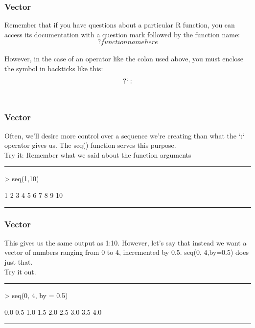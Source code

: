 \documentclass{beamer}
\begin{document}
\begin{frame}[fragile]
	\frametitle{Vector}
  	Remember that if you have questions about a particular R function, you can access its documentation with a question mark followed by the function name:\\
\begin{equation}?function name here \end{equation}\\
  However, in the case of an operator like the colon used above, you must enclose the symbol in backticks like this:\\
  \begin{equation}?`: \end{equation}\\
\end{frame}

\begin{frame}[fragile]
	\frametitle{Vector}
	Often, we'll desire more control over a sequence we're creating than what the `:` operator gives us. The seq() function serves this purpose.\\
	\centering Try it: \small Remember what we said about the function arguments\\
	\pause
	\rule{\textwidth}{0.4pt}
\begin{Schunk}
\begin{Sinput}
> seq(1,10)
\end{Sinput}
\begin{Soutput}
 [1]  1  2  3  4  5  6  7  8  9 10
\end{Soutput}
\end{Schunk}
	\rule{\textwidth}{0.4pt}
\end{frame}

\begin{frame}[fragile]
	\frametitle{Vector}
	This gives us the same output as 1:10. However, let's say that instead we want a vector of numbers ranging from 0 to 4, incremented by 0.5. seq(0, 4,by=0.5) does just that.\\
	\centering Try it out.\\
	\pause
	\rule{\textwidth}{0.4pt}
\begin{Schunk}
\begin{Sinput}
> seq(0, 4, by = 0.5)
\end{Sinput}
\begin{Soutput}
[1] 0.0 0.5 1.0 1.5 2.0 2.5 3.0 3.5 4.0
\end{Soutput}
\end{Schunk}
\rule{\textwidth}{0.4pt}
\end{frame}
\end{document}
